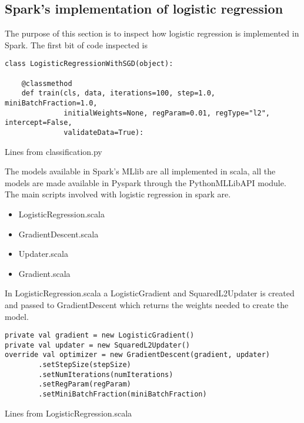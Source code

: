 \subsection{Spark's implementation of logistic regression}\label{sec:sparklogreg}
The purpose of this section is to inspect how logistic regression is implemented in Spark.
The first bit of code inspected is 
\begin{listing}[H]
\begin{verbatim}
class LogisticRegressionWithSGD(object):

    @classmethod
    def train(cls, data, iterations=100, step=1.0, miniBatchFraction=1.0,
              initialWeights=None, regParam=0.01, regType="l2", intercept=False,
              validateData=True):  
\end{verbatim}
\caption{Lines from classification.py}
\end{listing}

The models available in Spark's MLlib are all implemented in scala, all the models are made available in Pyspark through the PythonMLLibAPI module. 
The main scripts involved with logistic regression in spark are. 
\begin{itemize}
\item LogisticRegression.scala
\item GradientDescent.scala
\item Updater.scala 
\item Gradient.scala
\end{itemize}
In LogisticRegression.scala a LogisticGradient and SquaredL2Updater is created and passed to GradientDescent which returns the weights needed to create the model. 

\begin{listing}[H]
\begin{verbatim}
private val gradient = new LogisticGradient()
private val updater = new SquaredL2Updater()
override val optimizer = new GradientDescent(gradient, updater)
        .setStepSize(stepSize)
        .setNumIterations(numIterations)
        .setRegParam(regParam)
        .setMiniBatchFraction(miniBatchFraction)
\end{verbatim}
\caption{Lines from LogisticRegression.scala}
\label{lst:gd_logreg}
\end{listing}

